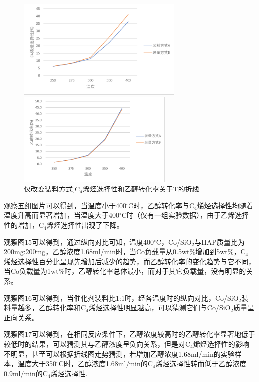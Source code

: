 \documentclass[a4paper,10.5pt]{ctexart}
\begin{document}
\begin{figure}[h]
\centering
\begin{minipage}[t]{0.48\textwidth}
\centering
\includegraphics[width=8cm]{50501wt1.68装料C4.png}
\end{minipage}
\begin{minipage}[t]{0.48\textwidth}
\centering
\includegraphics[width=7.5cm]{50501wt1.68装料乙醇.png}
\end{minipage}
\caption{\centering 仅改变装料方式,C$_4$烯烃选择性和乙醇转化率关于T的折线}
\end{figure}
\par 观察五组图片可以得到，当温度小于400$^{\circ}$C时，乙醇转化率与C$_4$烯烃选择性均随着温度升高而显著增加，当温度大于400$^{\circ}$C时（仅有一组实验数据），由于乙烯选择性的增加，C$_4$烯烃选择性出现了下降。
\par 观察图15可以得到，通过纵向对比可知，温度400$^{\circ}$C，Co/SiO$_2$与HAP质量比为200mg:200mg，乙醇浓度1.68ml/min时，当Co负载量从0.5wt$\%$增加到5wt$\%$，C$_4$烯烃选择性百分比呈现先增加后减少的趋势，而乙醇转化率的变化趋势与它不同，当Co负载量为1wt$\%$时，乙醇转化率总体最小，而对于其它负载量，没有明显的关系。
\par 观察图16可以得到，当催化剂装料比1:1时，经各温度时的纵向对比，Co/SiO$_2$装料量越多，乙醇转化率和C$_4$烯烃选择性明显越高，可以猜测它们与Co/SiO$_2$质量呈正向关系。
\par 观察图17可以得到，在相同反应条件下，乙醇浓度较高时的乙醇转化率显著地低于较低时的结果，可以猜测其与乙醇浓度呈负向关系，但是对C$_4$烯烃选择性的影响不明显，甚至可以根据折线图走势猜测，若增加乙醇浓度1.68ml/min的实验样本，温度大于350$^{\circ}$C时，乙醇浓度1.68ml/min的C$_4$烯烃选择性转而低于乙醇浓度0.9ml/min的C$_4$烯烃选择性.
\end{document}
